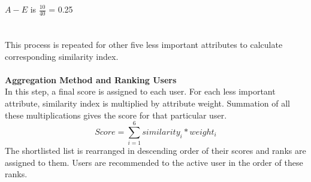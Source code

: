 \documentclass[12pt,oneside]{book}
\begin{document}
$A-E$ is \(\displaystyle \frac{10}{40} \) = 0.25\\\\\\
This process is repeated for other five less important attributes to calculate corresponding similarity index.\\\\
\textbf{Aggregation Method and Ranking Users}\\
In this step, a final score is assigned to each user. For each less important attribute, similarity index is multiplied by attribute weight. Summation of all these multiplications gives the score for that particular user.\\
$$\textit{Score} = \sum_{i=1}^{6} similarity_i * weight_i$$
The shortlisted list is rearranged in descending order of their scores and ranks are assigned to them. Users are recommended to the active user in the order of these ranks.\\
 
\end{document}
